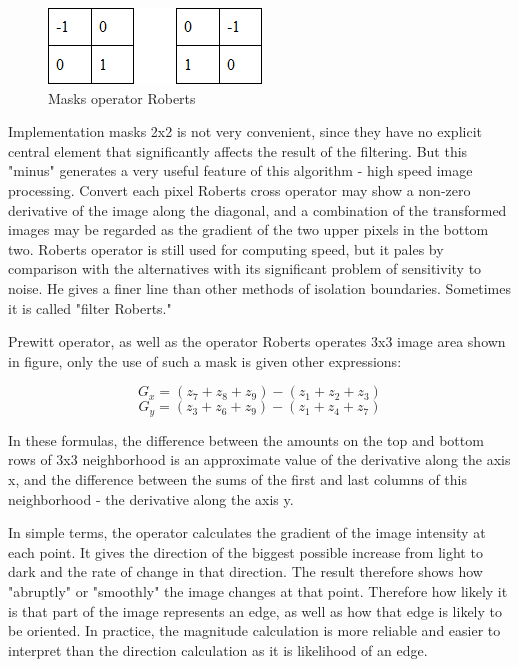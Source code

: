 \begin{figure}[h]
    \centering
    \includegraphics{Figures/masks_operator_roberts}
    \caption{Masks operator Roberts}
    \label{fig:masks_operator_roberts}
\end{figure}

Implementation masks 2x2 is not very convenient, since they have no explicit central element that significantly affects the result of the filtering. But this "minus" generates a very useful feature of this algorithm - high speed image processing. Convert each pixel Roberts cross operator may show a non-zero derivative of the image along the diagonal, and a combination of the transformed images may be regarded as the gradient of the two upper pixels in the bottom two. Roberts operator is still used for computing speed, but it pales by comparison with the alternatives with its significant problem of sensitivity to noise. He gives a finer line than other methods of isolation boundaries. Sometimes it is called "filter Roberts."\cite{Seif}

Prewitt operator, as well as the operator Roberts operates 3x3 image area shown in figure, only the use of such a mask is given other expressions: 

\begin{equation}
    G_x = (z_7 + z_8 + z_9) - (z_1 + z_2 + z_3)
\end{equation}
\begin{equation}
    G_y = (z_3 + z_6 + z_9) - (z_1 + z_4 + z_7)
\end{equation}

In these formulas, the difference between the amounts on the top and bottom rows of 3x3 neighborhood is an approximate value of the derivative along the axis x, and the difference between the sums of the first and last columns of this neighborhood - the derivative along the axis y. 

In simple terms, the operator calculates the gradient of the image intensity at each point. It gives the direction of the biggest possible increase from light to dark and the rate of change in that direction. The result therefore shows how "abruptly" or "smoothly" the image changes at that point. Therefore how likely it is that part of the image represents an edge, as well as how that edge is likely to be oriented. In practice, the magnitude calculation is more reliable and easier to interpret than the direction calculation as it is likelihood of an edge. \cite{Roberts}

